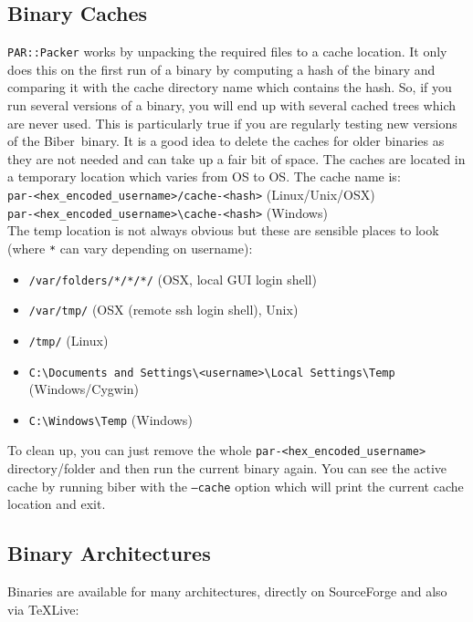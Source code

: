 \documentclass{ltxdockit}
\newcommand*{\biber}{Biber\xspace}
\begin{document}
\subsection{Binary Caches}\label{bc}

\verb+PAR::Packer+ works by unpacking the required files to a cache
location. It only does this on the first run of a binary 
by computing a hash of the binary and comparing it with
the cache directory name which contains the hash. So, if you run
several versions of a binary, you will end up with several cached
trees which are never used. This is particularly true if you are regularly
testing new versions of the \biber\ binary. It is a good idea to
delete the caches for older binaries as they are not needed and can take up
a fair bit of space. The caches are located in a temporary location which
varies from OS to OS. The cache name is:\\[1ex]

\noindent\verb+par-<hex_encoded_username>/cache-<hash>+ (Linux/Unix/OSX)\\
\verb+par-<hex_encoded_username>\cache-<hash>+ (Windows)\\[1ex]

\noindent The temp location is not always obvious but these are sensible
places to look (where \verb+*+ can vary depending on username):

\begin{itemize}
\item \verb+/var/folders/*/*/*/+ (OSX, local GUI login shell)
\item \verb+/var/tmp/+ (OSX (remote ssh login shell), Unix)
\item \verb+/tmp/+ (Linux)
\item \verb+C:\Documents and Settings\<username>\Local Settings\Temp+ (Windows/Cygwin)
\item \verb+C:\Windows\Temp+ (Windows)
\end{itemize}

\noindent To clean up, you can just remove the whole \verb+par-<hex_encoded_username>+
directory/folder and then run the current binary again. You can see the active cache by running biber with the \texttt{--cache} option which will print the current cache location and exit.

\subsection{Binary Architectures}

Binaries are available for many architectures, directly on SourceForge and
also via \TeX Live:
\end{document}
